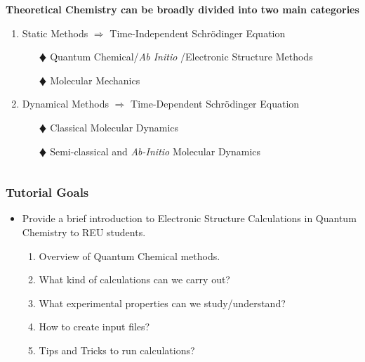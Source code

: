 \documentclass[slidestop,mathserif,compress,xcolor=svgnames]{beamer}
\begin{document}
\begin{frame}
\begin{columns}
\column{11cm}
\begin{exampleblock}{{\bf Theoretical Chemistry can be broadly divided into two main categories}}
\begin{enumerate}
\item Static Methods {\Large$\Rightarrow$} {\color{blue}Time-Independent Schr\"{o}dinger Equation}
\begin{enumerate}
\item[$\vardiamond$] Quantum Chemical/\emph{Ab Initio} /Electronic Structure Methods
\item[$\vardiamond$] Molecular Mechanics
\end{enumerate}
\item Dynamical Methods {\Large$\Rightarrow$} {\color{blue}Time-Dependent Schr\"{o}dinger Equation}
\begin{enumerate}
\item[$\vardiamond$] Classical Molecular Dynamics
\item[$\vardiamond$] Semi-classical and \textit{Ab-Initio} Molecular Dynamics
\end{enumerate}
\end{enumerate}
\end{exampleblock}
\end{columns}
\end{frame}

\begin{frame}
\frametitle{\small Tutorial Goals}
\begin{itemize}
\item Provide a brief introduction to Electronic Structure Calculations in Quantum Chemistry to REU students.
\begin{enumerate}
\item Overview of Quantum Chemical methods.
\item What kind of calculations can we carry out?
\item What experimental properties can we study/understand?
\item How to create input files?
\item Tips and Tricks to run calculations?
\end{enumerate}
\end{itemize}
\end{frame}


\end{document}
